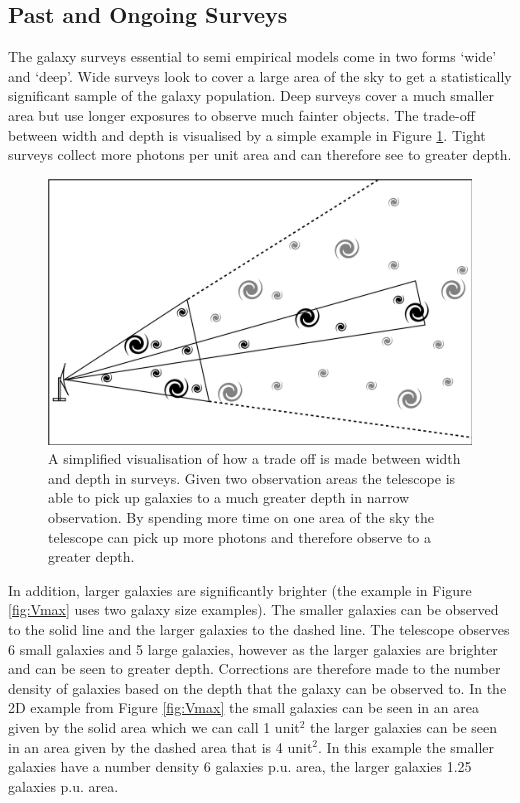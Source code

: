 \subsection{Past and Ongoing Surveys}
The galaxy surveys essential to semi empirical models come in two forms `wide' and `deep'. Wide surveys look to cover a large area of the sky to get a statistically significant sample of the galaxy population. Deep surveys cover a much smaller area but use longer exposures to observe much fainter objects. The trade-off between width and depth is visualised by a simple example in Figure \ref{fig:WvD}. Tight surveys collect more photons per unit area and can therefore see to greater depth.

\begin{figure}[h]
    \centering
    \includegraphics[width = \linewidth]{Figures/Chapter1/W_v_D_Toon.png}
    \caption{A simplified visualisation of how a trade off is made between width and depth in surveys. Given two observation areas the telescope is able to pick up galaxies to a much greater depth in narrow observation. By spending more time on one area of the sky the telescope can pick up more photons and therefore observe to a greater depth.}
    \label{fig:WvD}
\end{figure}

In addition, larger galaxies are significantly brighter (the example in Figure \ref{fig:Vmax} uses two galaxy size examples). The smaller galaxies can be observed to the solid line and the larger galaxies to the dashed line. The telescope observes 6 small galaxies and 5 large galaxies, however as the larger galaxies are brighter and can be seen to greater depth. Corrections are therefore made to the number density of galaxies based on the depth that the galaxy can be observed to. In the 2D example from Figure \ref{fig:Vmax} the small galaxies can be seen in an area given by the solid area which we can call 1 unit$^2$ the larger galaxies can be seen in an area given by the dashed area that is 4 unit$^2$. In this example the smaller galaxies have a number density 6 galaxies p.u. area, the larger galaxies 1.25 galaxies p.u. area.

